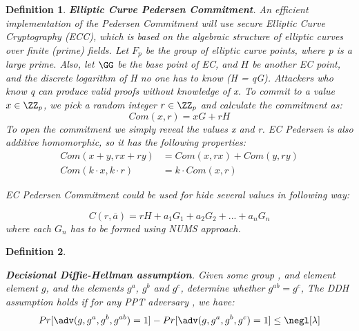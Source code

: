 \documentclass{article}
\newtheorem{myDef}{Definition}
\begin{document}
\begin{myDef}
\label{d:ecpc}
\textbf{Elliptic Curve Pedersen Commitment\cite{francca2015homomorphic}}. An efficient implementation of the Pedersen Commitment will use secure Elliptic Curve Cryptography (ECC), which is based on the algebraic structure of elliptic curves over finite (prime) fields. Let $F_p$ be the
group of elliptic curve points, where p is a large prime. Also, let $\GG$ be the base point of EC, and ${H}$ be another EC point, and the discrete logarithm of H no one has to know (H = qG). Attackers who know q can produce valid proofs without knowledge of x. To commit to a value $x \in \ZZ_p$, we pick a random integer $r \in \ZZ_p$ and calculate the commitment as:
$$
Com(x, r) = xG + rH
$$
To open the commitment we simply reveal the values x and r. EC Pedersen is also additive homomorphic, so it has the following properties:
\begin{equation}
\begin{split}
Com(x + y, rx + ry) &= Com(x, rx) + Com(y, ry) \\
Com(k \cdot x, k \cdot r) &= k \cdot Com(x, r)
\end{split}
\end{equation}

EC Pedersen Commitment could be used for hide several values in following way:

\begin{equation}
    C(r, \overline{a}) = rH + a_1G_1 + a_2G_2 + ... + a_nG_n
\end{equation}
where each $G_n$ has to be formed using NUMS\cite{black2014elliptic} approach. 

\end{myDef}


\begin{myDef}
\label{d:ddh}

\textbf{Decisional Diffie-Hellman assumption}. Given some group \GG, and element element $g$, and the elements $g^a$, $g^b$ and $g^{c}$, determine whether $g^{ab} = g^c$, The DDH assumption holds if for any PPT adversary \adv, we have: 
\begin{equation}
    Pr[\adv(g, g^a, g^b, g^{ab}) = 1] - Pr[\adv(g, g^a, g^b, g^c) = 1] \leq \negl[\lambda]
\end{equation}

\end{myDef}
\end{document}
